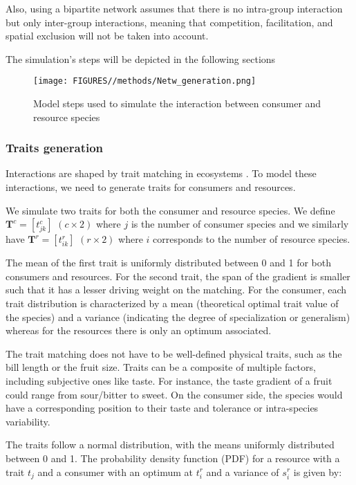 Also, using a bipartite network assumes that there is no intra-group interaction but only inter-group interactions, meaning that competition, facilitation, and spatial exclusion will not be taken into account.

The simulation's steps will be depicted in the following sections

\begin{figure}
    \centering
    \texttt{[image: FIGURES//methods/Netw\_generation.png]}
    \caption{Model steps used to simulate the interaction between consumer and resource species}
    \label{fig:netw_generation}
\end{figure}




\subsubsection{Traits generation}

Interactions are shaped by trait matching in ecosystems \citep{vazquez2009uniting}. To model these interactions, we need to generate traits for consumers and resources.


We simulate two traits for both the consumer and resource species. We define $\mathbf{T}^c = [t^c_{jk}]$ $(c \times 2)$ where $j$ is the number of consumer species and we similarly have $\mathbf{T}^r = [t^r_{ik}]$ $(r \times 2)$ where $i$ corresponds to the number of resource species.

The mean of the first trait is uniformly distributed between 0 and 1 for both consumers and resources. For the second trait, the span of the gradient is smaller such that it has a lesser driving weight on the matching.
For the consumer, each trait distribution is characterized by a mean (theoretical optimal trait value of the species) and a variance (indicating the degree of specialization or generalism) whereas for the resources there is only an optimum associated.

The trait matching does not have to be well-defined physical traits, such as the bill length or the fruit size. Traits can be a composite of multiple factors, including subjective ones like taste. For instance, the taste gradient of a fruit could range from sour/bitter to sweet. On the consumer side, the species would have a corresponding position to their taste and tolerance or intra-species variability.

The traits follow a normal distribution, with the means uniformly distributed between 0 and 1. The probability density function (PDF) for a resource with a trait $t_j$ and a consumer with an optimum at $t_i^r$ and a variance of $s_i^r$ is given by:

